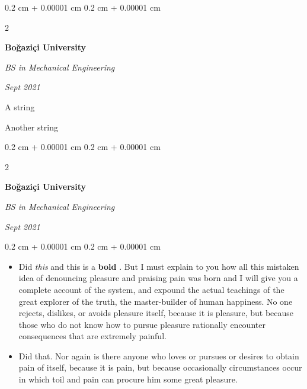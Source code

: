 \documentclass[10pt, letterpaper]{article}
\newenvironment{summary}{
    \begin{description}[
        topsep=0.10 cm,
        parsep=0.10 cm,
        partopsep=0pt,
        itemsep=0pt,
        leftmargin=0.4 cm + 10pt
    ]
}{
    \end{description}
} %
\newenvironment{highlights}{
    \begin{itemize}[
        topsep=0.10 cm,
        parsep=0.10 cm,
        partopsep=0pt,
        itemsep=0pt,
        leftmargin=0.4 cm + 10pt
    ]
}{
    \end{itemize}
} %
\newenvironment{onecolentry}{
    \begin{adjustwidth}{
        0.2 cm + 0.00001 cm
    }{
        0.2 cm + 0.00001 cm
    }
}{
    \end{adjustwidth}
} %
\newenvironment{twocolentry}[2][]{
    \onecolentry
    \def\secondColumn{#2}
    \setcolumnwidth{\fill, 4.5 cm}
    \begin{paracol}{2}
}{
    \switchcolumn \raggedleft \secondColumn
    \end{paracol}
    \endonecolentry
} %
\let\hrefWithoutArrow\href
\renewcommand{\href}[2]{\hrefWithoutArrow{#1}{\ifthenelse{\equal{#2}{}}{ }{#2 }\raisebox{.15ex}{\footnotesize \faExternalLink*}}}
\begin{document}
        \vspace{0.2 cm}

        \begin{twocolentry}{
            
            
        \textit{Sept 2021}}
            \textbf{Boğaziçi University}

            \textit{BS in Mechanical Engineering}
        \end{twocolentry}
            \begin{summary}
                \item A string
                \item Another string
            \end{summary}


        \vspace{0.2 cm}

        \begin{twocolentry}{
            
            
        \textit{Sept 2021}}
            \textbf{Boğaziçi University}

            \textit{BS in Mechanical Engineering}
        \end{twocolentry}
        \vspace{0.10 cm}
        \begin{onecolentry}
            \begin{highlights}
                \item Did \textit{this} and this is a \textbf{bold} \href{https://example.com}{link}. But I must explain to you how all this mistaken idea of denouncing pleasure and praising pain was born and I will give you a complete account of the system, and expound the actual teachings of the great explorer of the truth, the master-builder of human happiness. No one rejects, dislikes, or avoids pleasure itself, because it is pleasure, but because those who do not know how to pursue pleasure rationally encounter consequences that are extremely painful.
                \item Did that. Nor again is there anyone who loves or pursues or desires to obtain pain of itself, because it is pain, but because occasionally circumstances occur in which toil and pain can procure him some great pleasure.
            \end{highlights}
        \end{onecolentry}


        \vspace{0.2 cm}
\end{document}
